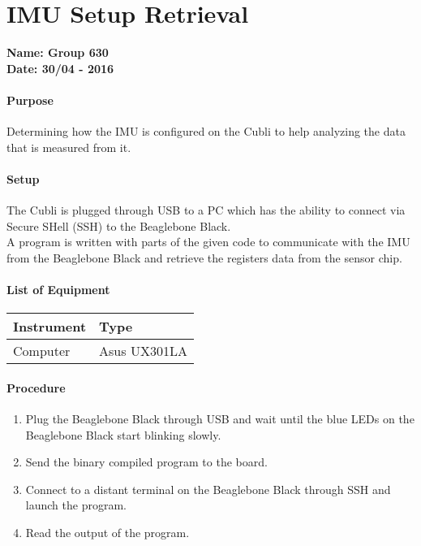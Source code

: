 \chapter{IMU Setup Retrieval} \label{app:IMUSetupRetrieval}
\textbf{Name: Group 630}\\
\textbf{Date: 30/04 - 2016}

\subsubsection{Purpose}
Determining how the IMU is configured on the Cubli to help analyzing the data that is measured from it.

\subsubsection{Setup}
The Cubli is plugged through USB to a PC which has the ability to connect via Secure SHell (SSH) to the Beaglebone Black.\\
A program is written with parts of the given code to communicate with the IMU from the Beaglebone Black and retrieve the registers data from the sensor chip.
                                                     
\subsubsection{List of Equipment}
\begin{table}[H]
	\centering
\begin{tabular}{|p{10cm}|p{4cm}|}
\hline%
  \textbf{Instrument}                &  \textbf{Type} \\
\hline%
  Computer                           &  Asus UX301LA  \\
\hline%
\end{tabular}
\end{table}

\subsubsection{Procedure}

\begin{enumerate}
  \item Plug the Beaglebone Black through USB and wait until the blue LEDs on the Beaglebone Black start blinking slowly.
  \item Send the binary compiled program to the board.
  \item Connect to a distant terminal on the Beaglebone Black through SSH and launch the program.
  \item Read the output of the program.
\end{enumerate}
